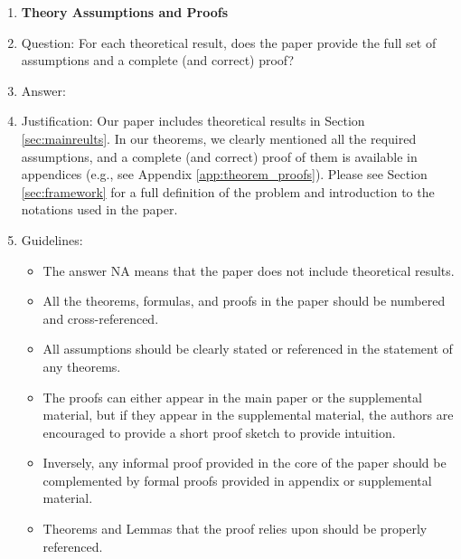 \documentclass{article}
\begin{document}
\begin{enumerate}
\item {\bf Theory Assumptions and Proofs}
    \item[] Question: For each theoretical result, does the paper provide the full set of assumptions and a complete (and correct) proof?
    \item[] Answer: \answerYes{} %
    \item[] Justification: Our paper includes theoretical results in Section \ref{sec:mainreults}. In our theorems, we clearly mentioned all the required assumptions, and a complete (and correct) proof of them is available in appendices (e.g., see Appendix \ref{app:theorem_proofs}). Please see Section \ref{sec:framework} for a full definition of the problem and introduction to the notations used in the paper. 
    \item[] Guidelines:
    \begin{itemize}
        \item The answer NA means that the paper does not include theoretical results. 
        \item All the theorems, formulas, and proofs in the paper should be numbered and cross-referenced.
        \item All assumptions should be clearly stated or referenced in the statement of any theorems.
        \item The proofs can either appear in the main paper or the supplemental material, but if they appear in the supplemental material, the authors are encouraged to provide a short proof sketch to provide intuition. 
        \item Inversely, any informal proof provided in the core of the paper should be complemented by formal proofs provided in appendix or supplemental material.
        \item Theorems and Lemmas that the proof relies upon should be properly referenced. 
    \end{itemize}


\end{enumerate}
\end{document}
